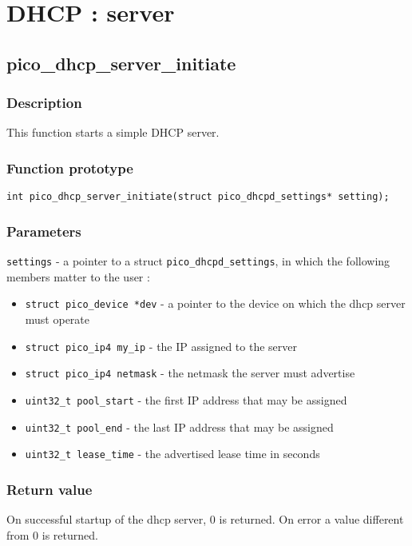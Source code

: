 \section{DHCP : server}



\subsection{pico\_dhcp\_server\_initiate}


\subsubsection*{Description}
This function starts a simple DHCP server. 

\subsubsection*{Function prototype}
\texttt{int pico\_dhcp\_server\_initiate(struct pico\_dhcpd\_settings* setting);}

\subsubsection*{Parameters}
\texttt{settings} - a pointer to a struct \texttt{pico\_dhcpd\_settings}, in which the following members matter to the user : 
\begin{itemize}
\item \texttt{struct pico\_device *dev} - a pointer to the device on which the dhcp server must operate
\item \texttt{struct pico\_ip4 my\_ip} - the IP assigned to the server
\item \texttt{struct pico\_ip4 netmask} - the netmask the server must advertise
\item \texttt{uint32\_t pool\_start} - the first IP address that may be assigned
\item \texttt{uint32\_t pool\_end} - the last IP address that may be assigned
\item \texttt{uint32\_t lease\_time} - the advertised lease time in seconds
\end{itemize}

\subsubsection*{Return value}
On successful startup of the dhcp server, 0 is returned. On error a value different from 0 is returned.


